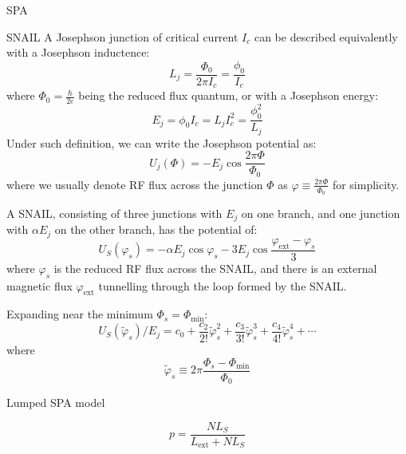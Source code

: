 \documentclass[12pt,a4paper]{article}
\begin{document}
\begin{section}{SPA}


\begin{subsection}{SNAIL}
A Josephson junction of critical current $I_c$ can be described equivalently with a Josephson inductence: 
\begin{equation}\label{eq:L_j}
L_j = \frac{\Phi_0}{2\pi I_c} = \frac{\phi_0}{I_c}
\end{equation}
where $\Phi_0 = \frac{\hbar}{2e}$ being the reduced flux quantum, or with a Josephson energy: 
\begin{equation}\label{eq:E_j}
E_j = \phi_0 I_c = L_j I_c^2 = \frac{\phi_0^2}{L_j}
\end{equation}
Under such definition, we can write the Josephson potential as: 
\begin{equation}\label{eq:U_j}
U_j(\Phi) = - E_j \cos{\frac{2\pi \Phi}{\Phi_0}}
\end{equation}
where we usually denote RF flux across the junction $\Phi$ as $\varphi \equiv \frac{2\pi \Phi}{\Phi_0}$ for simplicity. 

A SNAIL, consisting of three junctions with $E_j$ on one branch, and one junction with $\alpha E_j$ on the other branch, has the potential of: 
\begin{equation}\label{eq:U_S_original}
U_S(\varphi_s) = -\alpha E_j \cos{\varphi_s}-3 E_j \cos{\frac{\varphi_\mathrm{ext}-\varphi_s}{3}}
\end{equation}
where $\varphi_s$ is the reduced RF flux across the SNAIL, and there is an external magnetic flux $\varphi_\mathrm{ext}$ tunnelling through the loop formed by the SNAIL. 

Expanding near the minimum $\Phi_s = \Phi_\mathrm{min}$: 
\begin{equation}\label{eq:U_S}
U_S(\tilde{\varphi}_s)/E_j = c_0 + \frac{c_2}{2!} \tilde{\varphi}_s^2 + \frac{c_3}{3!} \tilde{\varphi}_s^3 + \frac{c_4}{4!} \tilde{\varphi}_s^4 + \cdots
\end{equation}
where
\begin{equation}\label{eq:varphi}
\tilde{\varphi}_s \equiv 2\pi \frac{\Phi_s - \Phi_\mathrm{min}}{\Phi_0}
\end{equation}


\end{subsection}

\begin{subsection}{Lumped SPA model}


\begin{equation}\label{eq:lumped_participation}
p = \frac{N L_S}{L_\mathrm{ext} + N L_S}
\end{equation}


\end{subsection}
\end{section}
\end{document}
